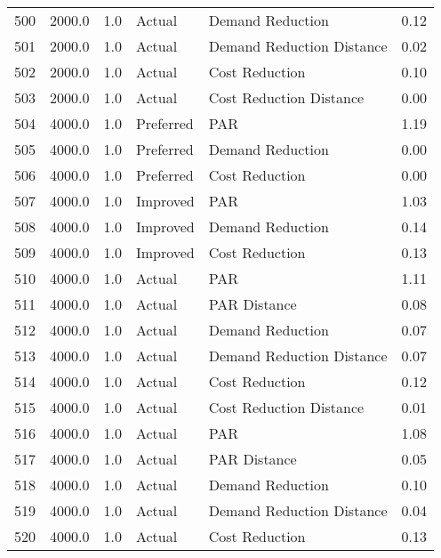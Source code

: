 \begin{longtable}{lrrllr}
500  &       2000.0 &     1.0 &         Actual &           Demand Reduction &   0.12 \\
501  &       2000.0 &     1.0 &         Actual &  Demand Reduction Distance &   0.02 \\
502  &       2000.0 &     1.0 &         Actual &             Cost Reduction &   0.10 \\
503  &       2000.0 &     1.0 &         Actual &    Cost Reduction Distance &   0.00 \\
504  &       4000.0 &     1.0 &      Preferred &                        PAR &   1.19 \\
505  &       4000.0 &     1.0 &      Preferred &           Demand Reduction &   0.00 \\
506  &       4000.0 &     1.0 &      Preferred &             Cost Reduction &   0.00 \\
507  &       4000.0 &     1.0 &       Improved &                        PAR &   1.03 \\
508  &       4000.0 &     1.0 &       Improved &           Demand Reduction &   0.14 \\
509  &       4000.0 &     1.0 &       Improved &             Cost Reduction &   0.13 \\
510  &       4000.0 &     1.0 &         Actual &                        PAR &   1.11 \\
511  &       4000.0 &     1.0 &         Actual &               PAR Distance &   0.08 \\
512  &       4000.0 &     1.0 &         Actual &           Demand Reduction &   0.07 \\
513  &       4000.0 &     1.0 &         Actual &  Demand Reduction Distance &   0.07 \\
514  &       4000.0 &     1.0 &         Actual &             Cost Reduction &   0.12 \\
515  &       4000.0 &     1.0 &         Actual &    Cost Reduction Distance &   0.01 \\
516  &       4000.0 &     1.0 &         Actual &                        PAR &   1.08 \\
517  &       4000.0 &     1.0 &         Actual &               PAR Distance &   0.05 \\
518  &       4000.0 &     1.0 &         Actual &           Demand Reduction &   0.10 \\
519  &       4000.0 &     1.0 &         Actual &  Demand Reduction Distance &   0.04 \\
520  &       4000.0 &     1.0 &         Actual &             Cost Reduction &   0.13 \\

\end{longtable}
